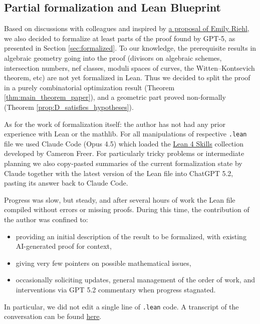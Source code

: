 \documentclass[12pt,reqno]{amsart}
\theoremstyle{definition}
\newcommand{\aiinline}[1]{{\color{aicolor}\uwave{#1}}}
\begin{document}
\subsection{Partial formalization and Lean Blueprint}
\begin{humanparagraph}
Based on discussions with colleagues and inspired by \href{https://emilyriehl.github.io/files/norms-hardy.pdf#page=33}{a proposal of Emily Riehl}, we also decided to formalize at least parts of the proof found by GPT-5, as presented in Section \ref{sec:formalized}. To our knowledge, the prerequisite results in algebraic geometry going into the proof (divisors on algebraic schemes, intersection numbers, nef classes, moduli spaces of curves, the Witten--Kontsevich theorem, etc) are not yet formalized in Lean. Thus we decided to split the proof in a purely combinatorial optimization result (Theorem \ref{thm:main_theorem_paper}), and a geometric part proved non-formally (Theorem \ref{prop:D_satisfies_hypotheses}).

As for the work of formalization itself: the author has not had any prior experience with Lean or the mathlib. For all manipulations of \aiinline{the} respective \texttt{.lean} file we used Claude Code (Opus 4.5) which loaded the \href{https://github.com/cameronfreer/lean4-skills}{Lean 4 Skills} collection developed by Cameron Freer. For particularly tricky problems or intermediate planning we also copy-pasted summaries of the current formalization state by Claude together with the latest version of the Lean file into ChatGPT 5.2, pasting its answer back to Claude Code.

Progress was slow, but steady, and after several hours of work the Lean file compiled without errors or missing proofs. During this time, the contribution of the author was confined to:
\begin{itemize}
    \item providing an initial description of the result to be formalized, with existing AI-generated proof for context,
    \item giving very few pointers on possible mathematical issues,
    \item occasionally soliciting updates, general management of the order of work, and interventions via GPT 5.2 commentary when progress stagnated.
\end{itemize}
In particular, we did not edit a single line of \texttt{.lean} code. A transcript of the conversation can be found \href{https://johannesschmitt.gitlab.io/balanced_vectors_lean_conversation.txt}{here}.


\end{humanparagraph}
\end{document}
